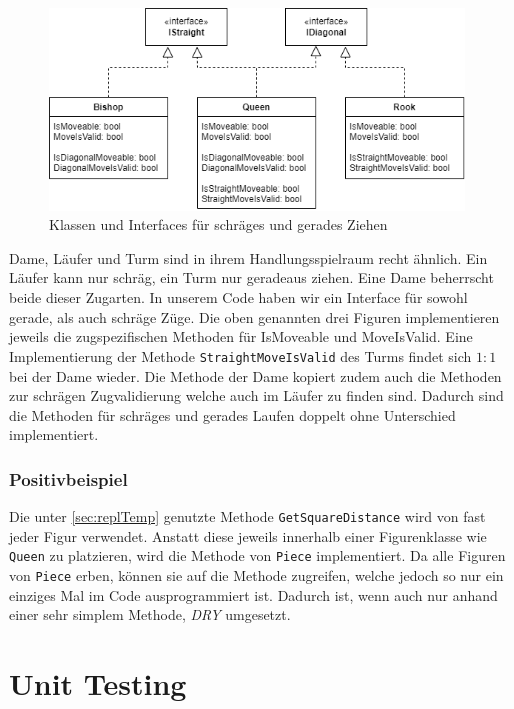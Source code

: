 \documentclass[
10pt, %
a4paper, %
oneside, %
headinclude,footinclude, %
BCOR5mm, %
]{scrartcl}
\begin{document}
\begin{onehalfspace}
\begin{figure}[h]
	\begin{center}
		\includegraphics[width=11cm]{MoveInterfaces.png}
		\caption{\label{pic:MoveInterfaces}Klassen und Interfaces für schräges und gerades Ziehen}
	\end{center}
\end{figure}

Dame, Läufer und Turm sind in ihrem Handlungsspielraum recht ähnlich. Ein Läufer kann nur schräg, ein Turm nur geradeaus ziehen. Eine Dame beherrscht beide dieser Zugarten. In unserem Code haben wir ein Interface für sowohl gerade, als auch schräge Züge. Die oben genannten drei Figuren implementieren jeweils die zugspezifischen Methoden für IsMoveable und MoveIsValid. 
Eine Implementierung der Methode \texttt{StraightMoveIsValid} des Turms findet sich $1:1$ bei der Dame wieder. Die Methode der Dame kopiert zudem auch die Methoden zur schrägen Zugvalidierung welche auch im Läufer zu finden sind. Dadurch sind die Methoden für schräges und gerades Laufen doppelt ohne Unterschied implementiert.

\subsubsection{Positivbeispiel}
Die unter \autoref{sec:replTemp} genutzte Methode \texttt{GetSquareDistance} wird von fast jeder Figur verwendet. Anstatt diese jeweils innerhalb einer Figurenklasse wie \texttt{Queen} zu platzieren, wird die Methode von \texttt{Piece} implementiert. Da alle Figuren von \texttt{Piece} erben, können sie auf die Methode zugreifen, welche jedoch so nur ein einziges Mal im Code ausprogrammiert ist. Dadurch ist, wenn auch nur anhand einer sehr simplem Methode, \textit{DRY} umgesetzt.
\newpage
\section{Unit Testing}

\end{onehalfspace}
\end{document}
